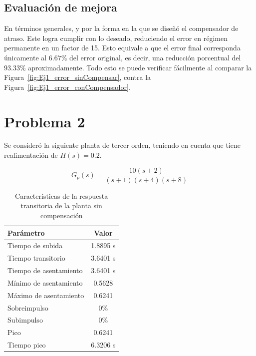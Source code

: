 \documentclass[journal]{IEEEtran}
\begin{document}
\subsection{Evaluación de mejora}
En términos generales, y por la forma en la que se diseñó el compensador de atraso. Este logra cumplir con lo deseado, 
reduciendo el error en régimen permanente en un factor de 15. Esto equivale a que el error final corresponda únicamente 
al $6.67\%$ del error original, es decir, una reducción porcentual del $93.33\%$ aproximadamente.
Todo esto se puede verificar fácilmente al comparar la Figura~\ref{fig:Ej1_error_sinCompensar}, contra la Figura~\ref{fig:Ej1_error_conCompensador}.


\section{Problema 2}
Se consideró la siguiente planta de tercer orden, teniendo en cuenta que tiene realimentación de \mbox{$H(s)=0.2$}.

\begin{equation}\label{eq:Planta}
G_p(s)=\frac{10(s+2)}{(s+1)(s+4)(s+8)}
\end{equation}

\begin{table}[H]
        \centering
        \caption{Características de la respuesta transitoria de la planta sin compensación}
        \label{tab:caracteristicas-respuesta-noncomp}
        \begin{tabular}{lc}
                \hline
                \textbf{Parámetro} & \textbf{Valor} \\
                \hline
                Tiempo de subida       & 1.8895 s \\
                Tiempo transitorio  & 3.6401 s \\
                Tiempo de asentamiento   & 3.6401 s \\
                Mínimo de asentamiento    & 0.5628  \\
                Máximo de asentamiento    & 0.6241  \\
                Sobreimpulso      & 0\% \\
                Subimpulso     & 0\% \\
                Pico           & 0.6241  \\
                Tiempo pico       & 6.3206 s \\
                \hline
        \end{tabular}
\end{table}
\end{document}
